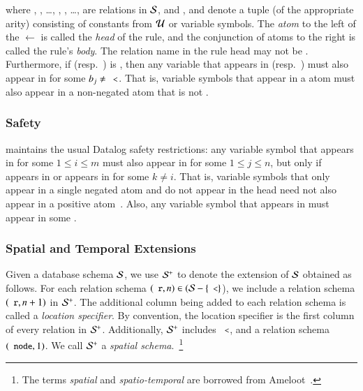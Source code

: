\noindent where , , \ldots, ,
, \ldots,  are relations in $\mathcal{S}$, and ,
 and  denote a tuple (of the appropriate arity)
consisting of constants from $\mathcal{U}$ or variable symbols.  The {\em atom} to the
left of the $\leftarrow$ is called the {\em head} of the rule, and the
conjunction of atoms to the right is called the rule's {\em body}.
The relation name in the rule head may not be \dedalus{<}. Furthermore, if
 (resp.\ ) is \dedalus{<}, then any variable
that appears in  (resp.\ ) must
also appear in  for some $b_j \neq \dedalus{<}$. That is,
variable symbols that appear in a \dedalus{<} atom must also appear in a
non-negated atom that is not \dedalus{<}.

\subsubsection{Safety}
\lang maintains the usual Datalog safety restrictions: any variable symbol
 that appears in  for some $1 \leq i \leq m$ must also
appear in  for some $1 \leq j \leq n$, but only if 
appears in  or  appears in  for some $k \neq
i$. That is, variable symbols that only appear in a single negated atom and do not
appear in the head need not also appear in a positive atom~\cite{ullmanbook}.
Also, any variable symbol that appears in  must appear in some
.

\subsubsection{Spatial and Temporal Extensions}

Given a database schema $\mathcal{S}$, we use $\mathcal{S}^+$ to denote the extension of $\mathcal{S}$
obtained as follows. For each relation schema $(\dedalus{r}, n) \in (\schema-\{\dedalus{<}\}$), we include a relation schema $(\dedalus{r}, n+1)$ in $\mathcal{S}^+$. The
additional column being added to each relation schema is called a {\em location specifier}. By convention, the
location specifier is the first column of every relation in $\mathcal{S}^+$.
Additionally, $\mathcal{S}^+$ includes $\dedalus{<}$, and a relation schema $(\dedalus{node},1)$.
We call $\mathcal{S}^+$ a {\em spatial schema}.~\footnote{The terms {\em spatial} and
  {\em spatio-temporal} are borrowed from Ameloot~\cite{ameloot-personal}.}

